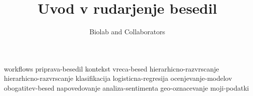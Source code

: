 \documentclass[symmetric, justified, a4paper]{tufte-book}
\title{Uvod v rudarjenje besedil}
\author[Biolab and Collaborators]{Biolab and Collaborators}
\begin{document}
\frontmatter

\maketitle



\tableofcontents

% 

\mainmatter



{workflows}
{priprava-besedil}
{kontekst}
{vreca-besed}
{hierarhicno-razvrscanje}
{hierarhicno-razvrscanje}
{klasifikacija}
{logisticna-regresija}
{ocenjevanje-modelov}
{obogatitev-besed}
{napovedovanje}
{analiza-sentimenta}
{geo-oznacevanje}
{moji-podatki}



\backmatter

% 
% 


\printindex
\end{document}
